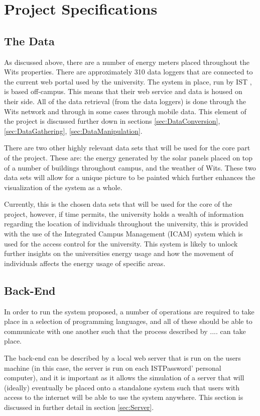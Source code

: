 \documentclass[12pt,onecolumn]{IEEEtran}
\begin{document}
\section{Project Specifications}

\subsection{The Data} \label{sec:TheData}
As discussed above, there are a number of energy meters placed throughout the Wits properties. There are approximately 310 data loggers that are connected to the current web portal used by the university. 
The system in place, run by IST \cite{IST}, is based off-campus. This means that their web service and data is housed on their side. All of the data retrieval (from the data loggers) is done through the Wits network and through in some cases through mobile data. This element of the project is discussed further down in sections \ref{sec:DataConversion}, \ref{sec:DataGathering}, \ref{sec:DataManipulation}. 

There are two other highly relevant data sets that will be used for the core part of the project. These are: the energy generated by the solar panels placed on top of a number of buildings throughout campus, and the weather of Wits. 
These two data sets will allow for a unique picture to be painted which further enhances the visualization of the system as a whole. 

Currently, this is the chosen data sets that will be used for the core of the project, however, if time permits, the university holds a wealth of information regarding the location of individuals throughout the university, this is provided with the use of the Integrated Campus Management (ICAM) system which is used for the access control for the university. 
This system is likely to unlock further insights on the universities energy usage and how the movement of individuals affects the energy usage of specific areas. 


\subsection{Back-End} \label{sec:BackEnd}
In order to run the system proposed, a number of operations are required to take place in a selection of programming languages, and all of these should be able to communicate with one another such that the process described by .... can take place. 

The back-end can be described by a local web server that is run on the users machine (in this case, the server is run on each ISTPassword' personal computer), and it is important as it allows the simulation of a server that will (ideally) eventually be placed onto a standalone system such that users with access to the internet will be able to use the system anywhere.
This section is discussed in further detail in section \ref{sec:Server}.
\end{document}
